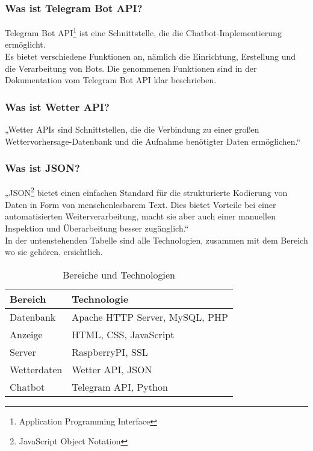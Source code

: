 \subsubsection{Was ist Telegram Bot API?} 
Telegram Bot API\footnote{Application Programming Interface} ist eine Schnittstelle, die die Chatbot-Implementierung ermöglicht. \\
Es bietet
verschiedene Funktionen an, nämlich die Einrichtung, Erstellung und die Verarbeitung von Bots. Die genommenen Funktionen sind in der Dokumentation vom Telegram Bot API klar beschrieben. \cite{50_telegram}  

\subsubsection{Was ist Wetter API?} 
„Wetter APIs sind Schnittstellen, die die Verbindung zu einer großen Wettervorhersage-Datenbank und die Aufnahme benötigter Daten ermöglichen.“ \cite{50_Wetter}
\subsubsection{Was ist JSON?} 
„JSON\footnote{JavaScript Object Notation} bietet einen einfachen Standard für die strukturierte Kodierung von Daten in Form von menschenlesbarem Text. Dies bietet Vorteile bei einer automatisierten Weiterverarbeitung, macht sie aber auch einer manuellen Inspektion und Überarbeitung besser zugänglich.“ \cite{50_json}
\\
In der untenstehenden Tabelle sind alle Technologien, zusammen mit dem Bereich wo sie gehören, ersichtlich. 
\begin{table}[h]
	\begin{center}
		
		\label{tab:Tabelle2}
	
			\begin{tabular}{ | l |l |} 
				\hline
				\textbf{Bereich} & \textbf{Technologie}\\ \hline 
				Datenbank &	Apache HTTP Server, MySQL, PHP \\ \hline
				Anzeige &	HTML, CSS, JavaScript \\ \hline
				Server &	RaspberryPI, SSL \\ \hline
				Wetterdaten	 &Wetter API, JSON \\ \hline
				Chatbot &	Telegram API, Python \\ \hline
				
				\hline
				 
		
		\end{tabular} 
		\caption{Bereiche und Technologien}
	\end{center}
\end{table} 
